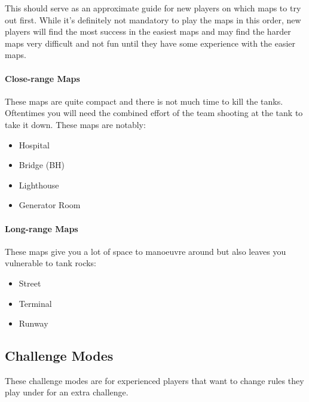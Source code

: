 This should serve as an approximate guide for new players on which maps to try out first. While it's definitely not mandatory to play the maps in this order, new players will find the most success in the easiest maps and may find the harder maps very difficult and not fun until they have some experience with the easier maps.

\paragraph{Close-range Maps}
These maps are quite compact and there is not much time to kill the tanks. Oftentimes you will need the combined effort of the team shooting at the tank to take it down. These maps are notably:
\begin{itemize}
\item Hospital
\item Bridge (BH)
\item Lighthouse
\item Generator Room
\end{itemize}

\paragraph{Long-range Maps}
These maps give you a lot of space to manoeuvre around but also leaves you vulnerable to tank rocks:
\begin{itemize}
\item Street
\item Terminal
\item Runway
\end{itemize}

\subsection{Challenge Modes}
These challenge modes are for experienced players that want to change rules they play under for an extra challenge.
